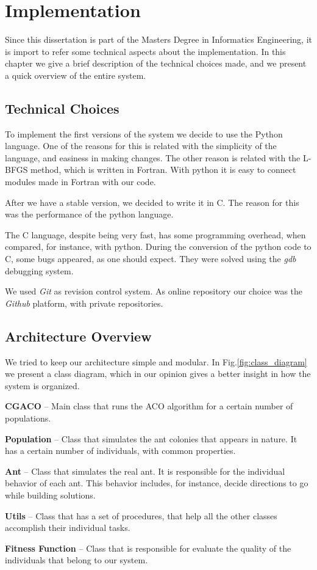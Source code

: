 \chapter{Implementation}

Since this dissertation is part of the Masters Degree in Informatics Engineering, it is import to refer some technical aspects about the implementation. In this chapter we give a brief description of the technical choices made, and we present a quick overview of the entire system.

\section{Technical Choices}

To implement the first versions of the system we decide to use the Python language. One of the reasons for this is related with the simplicity of the language, and easiness in making changes. The other reason is related with the L-BFGS method, which is written in Fortran. With python it is easy to connect modules made in Fortran with our code.

After we have a stable version, we decided to write it in C. The reason for this was the performance of the python language. 

The C language, despite being very fast, has some programming overhead, when compared, for instance, with python. During the conversion of the python code to C, some bugs appeared, as one should expect. They were solved using the \emph{gdb} debugging system.

We used \emph{Git} as revision control system. As online repository our choice was the \emph{Github} platform, with private repositories.

\section{Architecture Overview}
We tried to keep our architecture simple and modular. In Fig.\ref{fig:class_diagram} we present a class diagram, which in our opinion gives a better insight in how the system is organized.

\pagebreak
\textbf{CGACO} – Main class that runs the ACO algorithm for a certain number of populations.

\textbf{Population} – Class that simulates the ant colonies that appears in nature. It has a certain number of individuals, with common properties.

\textbf{Ant} – Class that simulates the real ant. It is responsible for the individual behavior of each ant. This behavior includes, for instance, decide directions to go while building solutions.

\textbf{Utils} – Class that has a set of procedures, that help all the other classes accomplish their individual tasks.

\textbf{Fitness Function} – Class that is responsible for evaluate the quality of the individuals that belong to our system.

